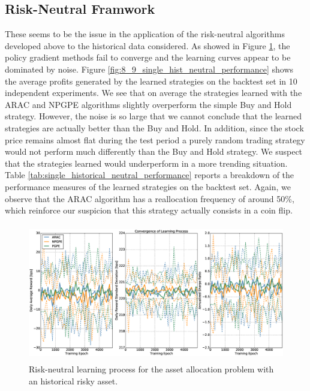 \subsection{Risk-Neutral Framwork}
These seems to be the issue in the application of the risk-neutral algorithms developed above to the historical data considered. As showed in Figure \ref{fig:8_8_rn_learning_process_historical}, the policy gradient methods fail to converge and the learning curves appear to be dominated by noise. Figure \ref{fig:8_9_single_hist_neutral_performance} shows the average profits generated by the learned strategies on the backtest set in 10 independent experiments. We see that on average the strategies learned with the \gls{ARAC} and \gls{NPGPE} algorithms slightly overperform the simple Buy and Hold strategy. However, the noise is so large that we cannot conclude that the learned strategies are actually better than the Buy and Hold. In addition, since the stock price remains almost flat during the test period a purely random trading strategy would not perform much differently than the Buy and Hold strategy. We suspect that the strategies learned would underperform in a more trending situation. Table \ref{tab:single_historical_neutral_performance} reports a breakdown of the performance measures of the learned strategies on the backtest set. Again, we observe that the \gls{ARAC} algorithm has a reallocation frequency of around 50\%, which reinforce our suspicion that this strategy actually consists in a coin flip. 

\begin{figure}[t!]
	\centering
	\includegraphics[height=6cm,width=1.0\textwidth]{Images/8_8_single_hist_neutral_convergence}
	\caption[Risk-neutral learning process for the historical risky asset]{Risk-neutral learning process for the asset allocation problem with an historical risky asset.}
	\label{fig:8_8_rn_learning_process_historical}
\end{figure}

